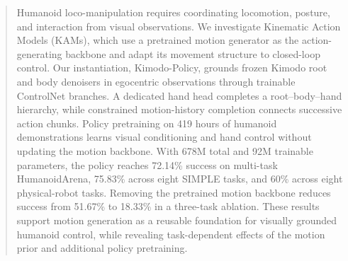 \begin{abstract}
Humanoid loco-manipulation requires coordinating locomotion, posture, and interaction from visual observations. We investigate Kinematic Action Models (KAMs), which use a pretrained motion generator as the action-generating backbone and adapt its movement structure to closed-loop control. Our instantiation, Kimodo-Policy, grounds frozen Kimodo root and body denoisers in egocentric observations through trainable ControlNet branches. A dedicated hand head completes a root--body--hand hierarchy, while constrained motion-history completion connects successive action chunks. Policy pretraining on 419 hours of humanoid demonstrations learns visual conditioning and hand control without updating the motion backbone. With 678M total and 92M trainable parameters, the policy reaches 72.14\% success on multi-task HumanoidArena, 75.83\% across eight SIMPLE tasks, and 60\% across eight physical-robot tasks. Removing the pretrained motion backbone reduces success from 51.67\% to 18.33\% in a three-task ablation. These results support motion generation as a reusable foundation for visually grounded humanoid control, while revealing task-dependent effects of the motion prior and additional policy pretraining.
\end{abstract}

